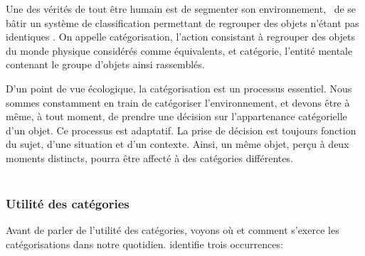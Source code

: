 Une des vérités de tout être humain est de segmenter son environnement, \ie~de se bâtir un système de classification permettant de regrouper des objets n'étant pas identiques \citep[p. 1]{rosch1978cognition}. On appelle catégorisation, l'action consistant à regrouper des objets du monde physique considérés comme équivalents, et catégorie, l'entité mentale contenant le groupe d'objets ainsi rassemblés. 
 
D'un point de vue écologique, la catégorisation est un processus essentiel. Nous sommes constamment en train de catégoriser l'environnement, et devons être à même, à tout moment, de prendre une décision sur l'appartenance catégorielle d'un objet. Ce processus est adaptatif. La prise de décision est toujours fonction du sujet, d'une situation et d'un contexte. Ainsi, un même objet, perçu à deux moments distincts, pourra être affecté à des catégories différentes. \\

 \\

\subsubsection{Utilité des catégories}

Avant de parler de l'utilité des catégories, voyons où et comment s'exerce les catégorisations dans notre quotidien. \citep{anderson1991adaptive} identifie trois occurrences: \\


